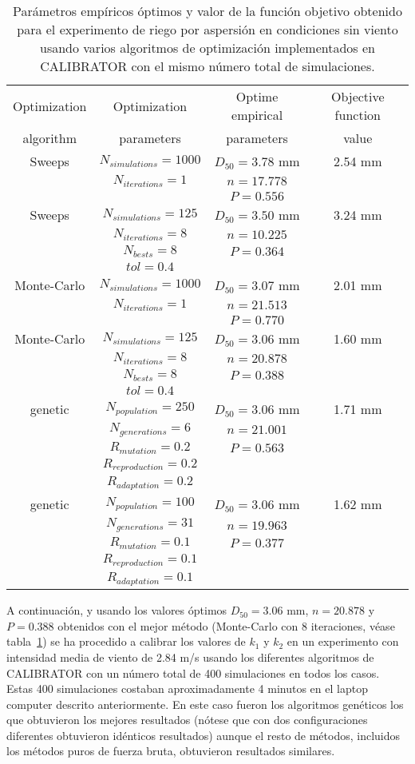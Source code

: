 \documentclass[review,authoryear]{elsarticle}
\newcommand{\TABLE}[5]
{
	\begin{table}[ht!]
		\centering
		\caption{#4.\label{#5}}
		#1
		\begin{tabular}{#2}
			#3
		\end{tabular}
	\end{table}
}
\begin{document}
\TABLE{\scriptsize}{cccc}
{
	Optimization & Optimization & Optime empirical & Objective function
	\\ algorithm & parameters & parameters & value
	\\ \hline
	Sweeps & $N_{simulations}=1000$ & $D_{50}=3.78$ mm & 2.54 mm
	\\ & $N_{iterations}=1$ & $n=17.778$
	\\ & & $P=0.556$
	\\ \hline
	Sweeps & $N_{simulations}=125$ & $D_{50}=3.50$ mm & 3.24 mm
	\\ & $N_{iterations}=8$ & $n=10.225$
	\\ & $N_{bests}=8$ & $P=0.364$
	\\ & $tol=0.4$
	\\ \hline
	Monte-Carlo & $N_{simulations}=1000$ & $D_{50}=3.07$ mm & 2.01 mm
	\\ & $N_{iterations}=1$ & $n=21.513$
	\\ & & $P=0.770$
	\\ \hline
	Monte-Carlo & $N_{simulations}=125$ & $D_{50}=3.06$ mm & 1.60 mm
	\\ & $N_{iterations}=8$ & $n=20.878$
	\\ & $N_{bests}=8$ & $P=0.388$
	\\ & $tol=0.4$
	\\ \hline
	genetic & $N_{population}=250$ & $D_{50}=3.06$ mm & 1.71 mm
	\\ & $N_{generations}=6$ & $n=21.001$
	\\ & $R_{mutation}=0.2$ & $P=0.563$
	\\ & $R_{reproduction}=0.2$
	\\ & $R_{adaptation}=0.2$
	\\ \hline
	genetic & $N_{population}=100$ & $D_{50}=3.06$ mm & 1.62 mm
	\\ & $N_{generations}=31$ & $n=19.963$
	\\ & $R_{mutation}=0.1$ & $P=0.377$
	\\ & $R_{reproduction}=0.1$
	\\ & $R_{adaptation}=0.1$
	\\ \hline
}{Parámetros empíricos óptimos y valor de la función objetivo obtenido para el
experimento de riego por aspersión en condiciones sin viento usando varios
algoritmos de optimización implementados en CALIBRATOR con el mismo número total
de simulaciones}{TabSprinklerI}

A continuación, y usando los valores óptimos $D_{50}=3.06$ mm, $n=20.878$ y
$P=0.388$ obtenidos con el mejor método (Monte-Carlo con 8 iteraciones, véase
tabla~\ref{TabSprinklerI}) se ha procedido a calibrar los valores de $k_1$ y
$k_2$ en un experimento con intensidad media de viento de 2.84 m/s usando los
diferentes algoritmos de CALIBRATOR con un número total de 400 simulaciones en
todos los casos. Estas 400 simulaciones costaban aproximadamente 4 minutos en el
laptop computer descrito anteriormente. En este caso fueron los algoritmos
genéticos los que obtuvieron los mejores resultados (nótese que con dos
configuraciones diferentes obtuvieron idénticos resultados) aunque el resto de
métodos, incluidos los métodos puros de fuerza bruta, obtuvieron resultados
similares.
\end{document}
